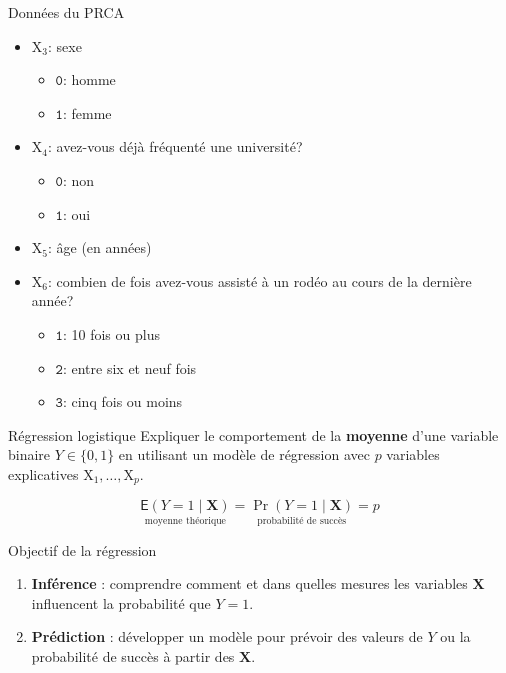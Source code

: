 \documentclass[
  ignorenonframetext,
]{beamer}
\providecommand{\tightlist}{%
  \setlength{\itemsep}{0pt}\setlength{\parskip}{0pt}}\usepackage{longtable,booktabs,array}
\begin{document}
\begin{frame}{Données du PRCA}
\protect\hypertarget{donnuxe9es-du-prca-1}{}
\footnotesize

\begin{itemize}
\tightlist
\item
  \(\mathrm{X}_3\): sexe

  \begin{itemize}
  \tightlist
  \item
    \(\texttt{0}\): homme
  \item
    \(\texttt{1}\): femme
  \end{itemize}
\item
  \(\mathrm{X}_4\): avez-vous déjà fréquenté une université?

  \begin{itemize}
  \tightlist
  \item
    \(\texttt{0}\): non
  \item
    \(\texttt{1}\): oui
  \end{itemize}
\item
  \(\mathrm{X}_5\): âge (en années)
\item
  \(\mathrm{X}_6\): combien de fois avez-vous assisté à un rodéo au
  cours de la dernière année?

  \begin{itemize}
  \tightlist
  \item
    \(\texttt{1}\): 10 fois ou plus
  \item
    \(\texttt{2}\): entre six et neuf fois
  \item
    \(\texttt{3}\): cinq fois ou moins
  \end{itemize}
\end{itemize}

\normalsize
\end{frame}

\begin{frame}{Régression logistique}
\protect\hypertarget{ruxe9gression-logistique}{}
Expliquer le comportement de la \textbf{moyenne} d'une variable binaire
\(Y\in\{0,1\}\) en utilisant un modèle de régression avec \(p\)
variables explicatives \(\mathrm{X}_1, \ldots, \mathrm{X}_p\).

\[\underset{\text{moyenne théorique}}{\mathsf{E}(Y=1 \mid \mathbf{X})} = \underset{\text{probabilité de succès}}{\Pr(Y=1 \mid \mathbf{X})}=p\]
\end{frame}

\begin{frame}{Objectif de la régression}
\protect\hypertarget{objectif-de-la-ruxe9gression}{}
\begin{enumerate}
[1)]
\tightlist
\item
  \textbf{Inférence} : comprendre comment et dans quelles mesures les
  variables \(\mathbf{X}\) influencent la probabilité que \(Y=1\).
\item
  \textbf{Prédiction} : développer un modèle pour prévoir des valeurs de
  \(Y\) ou la probabilité de succès à partir des \(\mathbf{X}\).
\end{enumerate}
\end{frame}
\end{document}
